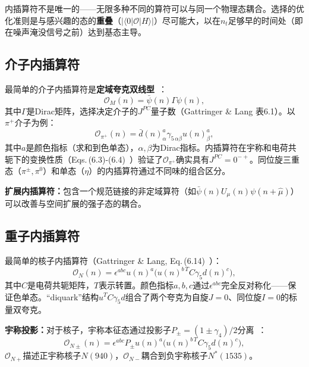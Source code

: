 \documentclass[12pt,a4paper]{ctexart}
\theoremstyle{definition}
\begin{document}
内插算符不是唯一的——无限多种不同的算符可以与同一个物理态耦合。选择的优化准则是与感兴趣的态的\textbf{重叠}（$|\langle 0|\mathcal{O}|H\rangle|$）尽可能大，以在$n_t$足够早的时间处（即在噪声淹没信号之前）达到基态主导。

\subsection{介子内插算符}

最简单的介子内插算符是\textbf{定域夸克双线型}~\cite{GattringerLang2010}：
\begin{equation}
\mathcal{O}_M(n) = \bar\psi(n) \Gamma \psi(n),
\label{eq:meson_local}
\end{equation}
其中$\Gamma$是Dirac矩阵，选择决定介子的$J^{PC}$量子数（Gattringer \& Lang 表6.1）。以$\pi^+$介子为例：
\begin{equation}
\mathcal{O}_{\pi^+}(n) = \bar d(n)_{\alpha}^a \gamma_{5\,\alpha\beta} u(n)_{\beta}^a,
\label{eq:pion_interpolator}
\end{equation}
其中$a$是颜色指标（求和到色单态），$\alpha,\beta$为Dirac指标。内插算符在宇称和电荷共轭下的变换性质（Eqs.\,(6.3)-(6.4)~\cite{GattringerLang2010}）验证了$\mathcal{O}_{\pi^+}$确实具有$J^{PC}=0^{-+}$。同位旋三重态（$\pi^\pm, \pi^0$）和单态（$\eta$）的内插算符通过不同味的组合区分。

\textbf{扩展内插算符：}包含一个规范链接的非定域算符（如$\bar\psi(n) U_\mu(n) \psi(n+\hat\mu)$）可以改善与空间扩展的强子态的耦合。

\subsection{重子内插算符}

最简单的核子内插算符（Gattringer \& Lang, Eq.\,(6.14)~\cite{GattringerLang2010}）：
\begin{equation}
\mathcal{O}_N(n) = \epsilon^{abc} u(n)^a \big( u(n)^{b\,T} C\gamma_5 d(n)^c \big),
\label{eq:nucleon_interpolator}
\end{equation}
其中$C$是电荷共轭矩阵，$T$表示转置。颜色指标$a,b,c$通过$\epsilon^{abc}$完全反对称化——保证色单态。``diquark''结构$u^T C\gamma_5 d$组合了两个夸克为自旋$J=0$、同位旋$I=0$的标量双夸克。

\textbf{宇称投影：}对于核子，宇称本征态通过投影子$P_\pm = (1 \pm \gamma_4)/2$分离~\cite{GattringerLang2010}：
\begin{equation}
\mathcal{O}_{N\pm}(n) = \epsilon^{abc} P_\pm u(n)^a \big(u(n)^{b\,T} C\gamma_5 d(n)^c\big),
\label{eq:nucleon_parity}
\end{equation}
$\mathcal{O}_{N+}$描述正宇称核子$N(940)$，$\mathcal{O}_{N-}$耦合到负宇称核子$N^*(1535)$。
\end{document}
